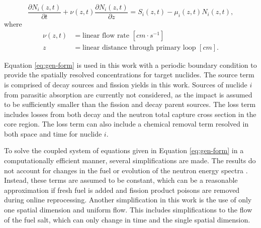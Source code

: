 \documentclass{style/nseJournal}
\begin{document}
\begin{equation}
    \frac{\partial N_i (z, t)}{\partial t} + \nu(z, t) \frac{\partial N_i (z, t)}{\partial z} = S_i(z, t) - \mu_i(z, t) N_i(z, t),
\label{eq:gen-form}
\end{equation}
where
\begin{align}
    \nu(z, t) &= \text{linear flow rate $[cm \cdot s^{-1}]$} \nonumber \\
    z &= \text{linear distance through primary loop $[cm]$}.
\end{align}

Equation \eqref{eq:gen-form} is used in this work with a periodic boundary condition to provide the spatially resolved concentrations for target nuclides.
The source term is comprised of decay sources and fission yields in this work.
Sources of nuclide $i$ from parasitic absorption are currently not considered, as the impact is assumed to be sufficiently smaller than the fission and decay parent sources.
The loss term includes losses from both decay and the neutron total capture cross section in the core region.
The loss term can also include a chemical removal term resolved in both space and time for nuclide $i$.


To solve the coupled system of equations given in Equation \eqref{eq:gen-form} in a computationally efficient manner, several simplifications are made. 
The results do not account for changes in the fuel or evolution of the neutron energy spectra \cite{openmc}.
Instead, these terms are assumed to be constant, which can be a reasonable approximation if fresh fuel is added and fission product poisons are removed during online reprocessing.
Another simplification in this work is the use of only one spatial dimension and uniform flow.
This includes simplifications to the flow of the fuel salt, which can only change in time and the single spatial dimension.
\end{document}
